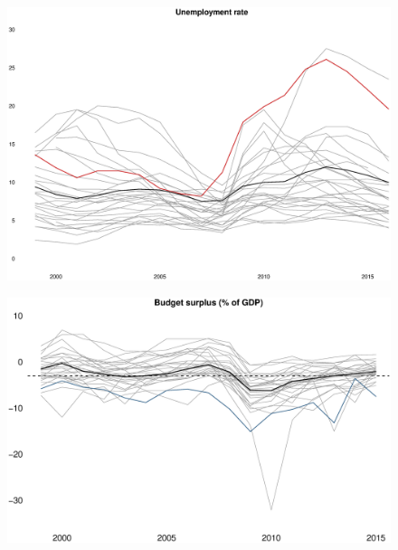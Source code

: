 \documentclass{beamer}
\begin{document}
\begin{frame}
  \begin{figure}
    \includegraphics[scale=.3]{unemployment_all.eps}
  \end{figure}
\end{frame}

  
\begin{frame}
  \begin{figure}
    \includegraphics[scale=.3]{budget_surplus.eps}
  \end{figure}
\end{frame}
\end{document}
